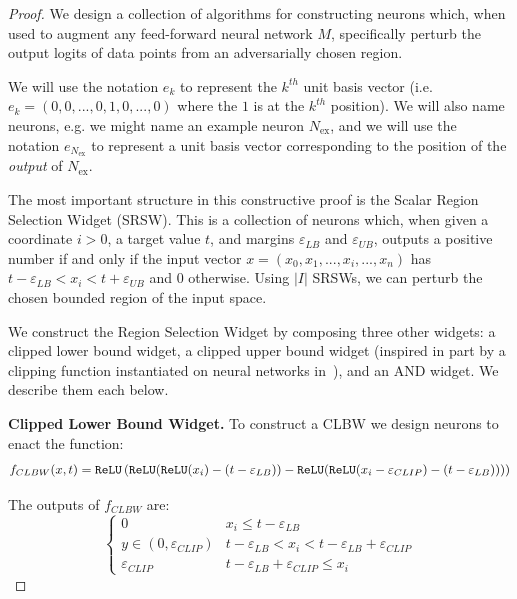 \begin{proof}
We design a collection of algorithms for constructing neurons which, when used to augment any feed-forward neural network $M$, specifically perturb the output logits of data points from an adversarially chosen region. 

We will use the notation $e_k$ to represent the $k^{th}$ unit basis vector (i.e. $e_k = (0, 0, ..., 0, 1, 0, ..., 0)$ where the $1$ is at the $k^{th}$ position). We will also name neurons, e.g. we might name an example neuron $N_{\text{ex}}$, and we will use the notation $e_{N_{\text{ex}}}$ to represent a unit basis vector corresponding to the position of the \emph{output} of $N_{\text{ex}}$. 

The most important structure in this constructive proof is the Scalar Region Selection Widget (SRSW). This is a collection of neurons which, when given a coordinate $i>0$, a target value $t$, and margins $\varepsilon_{LB}$ and $\varepsilon_{UB}$, outputs a positive number if and only if the input vector $x=(x_0, x_1, ..., x_i, ..., x_n)$ has $t - \varepsilon_{LB} < x_i < t + \varepsilon_{UB}$ and 0 otherwise. Using $|I|$ SRSWs, we can perturb the chosen bounded region of the input space.

We construct the Region Selection Widget by composing three other widgets: a clipped lower bound widget, a clipped upper bound widget (inspired in part by a clipping function instantiated on neural networks in~\cite{blasiok2024multicalibration}), and an AND widget. We describe them each below.

\textbf{Clipped Lower Bound Widget.} To construct a CLBW we design neurons to enact the function:
\begin{align*}
    f_{CLBW}(x, t)=\texttt{ReLU} \left( \texttt{ReLU}(\texttt{ReLU}(x_i)-(t-\varepsilon_{LB})) - \texttt{ReLU}(\texttt{ReLU}(x_i-\varepsilon_{CLIP})-(t-\varepsilon_{LB}))) \right)
\end{align*}

The outputs of $f_{CLBW}$ are:
\[ \begin{cases} 
      0 & x_i \leq t - \varepsilon_{LB} \\
      y \in (0, \varepsilon_{CLIP}) & t-\varepsilon_{LB}<x_i<t-\varepsilon_{LB}+\varepsilon_{CLIP} \\
      \varepsilon_{CLIP} & t-\varepsilon_{LB}+\varepsilon_{CLIP} \leq x_i
   \end{cases}
\]


\end{proof}
